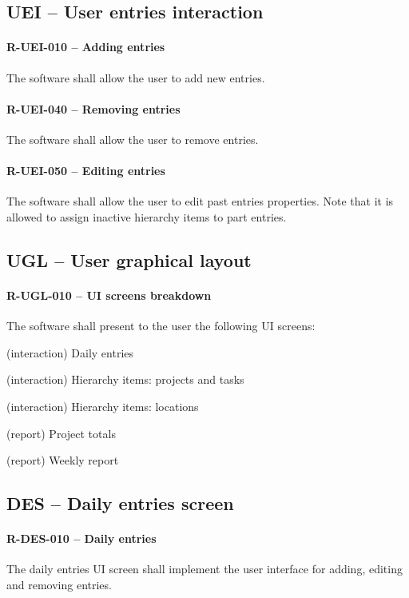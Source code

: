 \subsection{UEI -- User entries interaction}
\paragraph{R-UEI-010 -- Adding entries}
The software shall allow the user to add new entries.

\paragraph{R-UEI-040 -- Removing entries}
The software shall allow the user to remove entries.

\paragraph{R-UEI-050 -- Editing entries}
The software shall allow the user to edit past entries properties.
Note that it is allowed to assign inactive hierarchy items to
part entries.

\subsection{UGL -- User graphical layout}
\paragraph{R-UGL-010 -- \gls{UI} screens breakdown}
The software shall present to the user the following \gls{UI} screens:

\begin{compactitem}
\item (interaction) Daily entries
\item (interaction) Hierarchy items: projects and tasks
\item (interaction) Hierarchy items: locations
\item (report) Project totals
\item (report) Weekly report
\end{compactitem}

\subsection{DES -- Daily entries screen}
\paragraph{R-DES-010 -- Daily entries}
The daily entries \gls{UI} screen shall implement the user interface for adding,
editing and removing entries.

